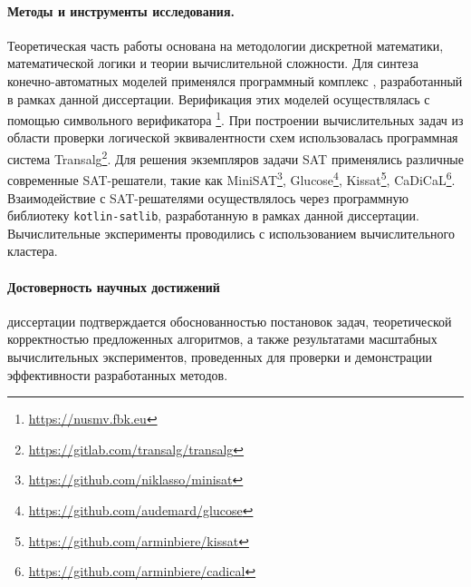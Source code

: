 %
%
\paragraph{Методы и инструменты исследования.}
%
Теоретическая часть работы основана на методологии дискретной математики, математической логики и теории вычислительной сложности.
Для синтеза конечно-автоматных моделей применялся программный комплекс , разработанный в рамках данной диссертации.
Верификация этих моделей осуществлялась с помощью символьного верификатора \footnote{\url{https://nusmv.fbk.eu}}.
При построении вычислительных задач из области проверки логической эквивалентности схем использовалась программная система Transalg\footnote{\url{https://gitlab.com/transalg/transalg}}.
Для решения экземпляров задачи SAT применялись различные современные SAT-решатели, такие как MiniSAT\footnote{\url{https://github.com/niklasso/minisat}}, Glucose\footnote{\url{https://github.com/audemard/glucose}}, Kissat\footnote{\url{https://github.com/arminbiere/kissat}}, CaDiCaL\footnote{\url{https://github.com/arminbiere/cadical}}.
Взаимодействие с SAT-решателями осуществлялось через программную библиотеку \texttt{kotlin-satlib}, разработанную в рамках данной диссертации.
Вычислительные эксперименты проводились с использованием вычислительного кластера.


%
%
\paragraph{Достоверность научных достижений} диссертации подтверждается обоснованностью постановок задач, теоретической корректностью предложенных алгоритмов, а также результатами масштабных вычислительных экспериментов, проведенных для проверки и демонстрации эффективности разработанных методов.


%
%
